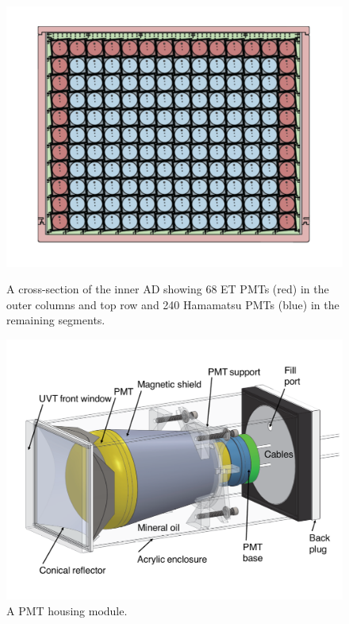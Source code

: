 \begin{figure}[h]
	\centering
	\begin{minipage}[t]{0.48\linewidth}
		\centering
		\includegraphics[width=0.95\linewidth]{tex/4-prospect-images/ADCrossSection}
		\caption[Cross-section of inner detector]{A cross-section of the inner AD showing 68 ET PMTs (red) in the outer columns and top row and 240 Hamamatsu PMTs (blue) in the remaining segments.}
		\label{fig:adcrosssection}
	\end{minipage}
	\begin{minipage}[t]{0.48\linewidth}
		\centering
		\includegraphics[width=0.95\linewidth]{tex/4-prospect-images/PMTHousing}
		\caption[PMT housing module]{A PMT housing module.}
		\label{fig:pmthousing}
	\end{minipage}
\end{figure}


